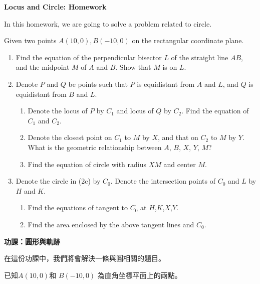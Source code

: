 \documentclass[12pt]{article}
\begin{document}
    \begin{center}
        \textbf{Locus and Circle: Homework}
    \end{center}

    In this homework, we are going to solve a problem related to circle.
    
    Given two points $A(10,0), B(-10,0)$ on the rectangular coordinate plane.

    \begin{enumerate}
        \item Find the equation of the perpendicular bisector $L$ of the straight line $AB$, and the midpoint $M$ of $A$ and $B$. Show that $M$ is on $L$.
        \item Denote $P$ and $Q$ be points such that $P$ is equidistant from $A$ and $L$, and $Q$ is equidistant from $B$ and $L$. \begin{enumerate}
            \item Denote the locus of $P$ by $C_1$ and locus of $Q$ by $C_2$. Find the equation of $C_1$ and $C_2$.
            \item Denote the closest point on $C_1$ to $M$ by $X$, and that on $C_2$ to $M$ by $Y$. What is the geometric relationship between $A$, $B$, $X$, $Y$, $M$?
            \item Find the equation of circle with radius $XM$ and center $M$.
        \end{enumerate}
        \item Denote the circle in (2c) by $C_0$. Denote the intersection points of $C_0$ and $L$ by $H$ and $K$. \begin{enumerate}
            \item Find the equations of tangent to $C_0$ at $H$,$K$,$X$,$Y$.
            \item Find the area enclosed by the above tangent lines and $C_0$.
        \end{enumerate}
    \end{enumerate}

    \newpage

    \begin{center}
        \textbf{功課：圓形與軌跡}
    \end{center}

    在這份功課中，我們將會解決一條與圓相關的題目。
    
    已知$A(10,0)$和 $B(-10,0)$ 為直角坐標平面上的兩點。
\end{document}
